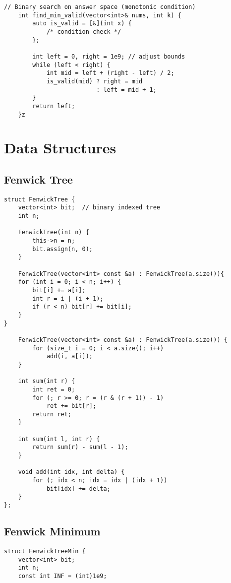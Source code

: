 \documentclass[10pt]{article}
\begin{document}
\begin{multicols*}{2}
\begin{lstlisting}[style=compactcpp]
    // Binary search on answer space (monotonic condition)
    int find_min_valid(vector<int>& nums, int k) {
        auto is_valid = [&](int x) { 
            /* condition check */ 
        };
        
        int left = 0, right = 1e9; // adjust bounds
        while (left < right) {
            int mid = left + (right - left) / 2;
            is_valid(mid) ? right = mid 
                          : left = mid + 1;
        }
        return left;
    }z
\end{lstlisting}
\section{Data Structures}
\subsection{Fenwick Tree}
\begin{lstlisting}[style=compactcpp]
struct FenwickTree {
    vector<int> bit;  // binary indexed tree
    int n;

    FenwickTree(int n) {
        this->n = n;
        bit.assign(n, 0);
    }

    FenwickTree(vector<int> const &a) : FenwickTree(a.size()){
    for (int i = 0; i < n; i++) {
        bit[i] += a[i];
        int r = i | (i + 1);
        if (r < n) bit[r] += bit[i];
    }
}

    FenwickTree(vector<int> const &a) : FenwickTree(a.size()) {
        for (size_t i = 0; i < a.size(); i++)
            add(i, a[i]);
    }

    int sum(int r) {
        int ret = 0;
        for (; r >= 0; r = (r & (r + 1)) - 1)
            ret += bit[r];
        return ret;
    }

    int sum(int l, int r) {
        return sum(r) - sum(l - 1);
    }

    void add(int idx, int delta) {
        for (; idx < n; idx = idx | (idx + 1))
            bit[idx] += delta;
    }
};
\end{lstlisting}

\subsection{Fenwick Minimum}

\begin{lstlisting}[style=compactcpp]
struct FenwickTreeMin {
    vector<int> bit;
    int n;
    const int INF = (int)1e9;


\end{lstlisting}
\end{multicols*}
\end{document}
